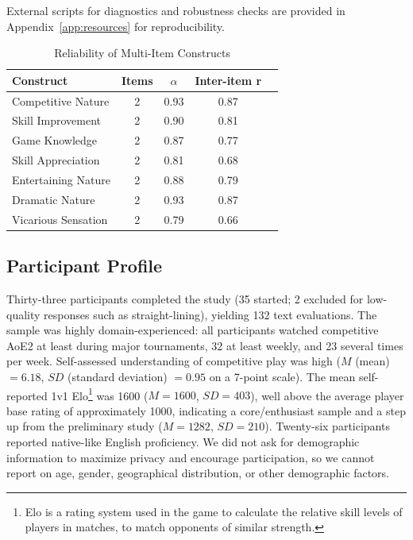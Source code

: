 External scripts for diagnostics and robustness checks are provided in Appendix~\ref{app:resources} for reproducibility.

\begin{table}[H]
  \centering
  \caption{Reliability of Multi-Item Constructs}
  \label{tab:reliability}
  \begin{tabular}{lcccl}
    \toprule
    \textbf{Construct}  & \textbf{Items} & $\alpha$ & \textbf{Inter-item r} \\
    \midrule
    Competitive Nature  & 2              & 0.93     & 0.87 \\
    Skill Improvement   & 2              & 0.90     & 0.81 \\
    Game Knowledge      & 2              & 0.87     & 0.77 \\
    Skill Appreciation  & 2              & 0.81     & 0.68 \\
    Entertaining Nature & 2              & 0.88     & 0.79 \\
    Dramatic Nature     & 2              & 0.93     & 0.87 \\
    Vicarious Sensation & 2              & 0.79     & 0.66 \\
    \bottomrule
  \end{tabular}
\end{table}

\subsection{Participant Profile}
Thirty-three participants completed the study (35 started; 2 excluded for low-quality responses such as straight-lining), yielding 132 text evaluations. The sample was highly domain-experienced: all participants watched competitive AoE2 at least during major tournaments, 32 at least weekly, and 23 several times per week. Self-assessed understanding of competitive play was high ($M$ (mean) $=6.18$, $SD$ (standard deviation) $=0.95$ on a 7-point scale). The mean self-reported 1v1 Elo\footnote{Elo is a rating system used in the game to calculate the relative skill levels of players in matches, to match opponents of similar strength.} was 1600 ($M=1600$, $SD=403$), well above the average player base rating of approximately 1000, indicating a core/enthusiast sample and a step up from the preliminary study ($M=1282$, $SD=210$). Twenty-six participants reported native-like English proficiency. We did not ask for demographic information to maximize privacy and encourage participation, so we cannot report on age, gender, geographical distribution, or other demographic factors.

